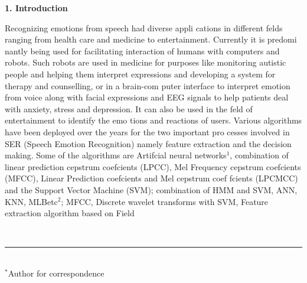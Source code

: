 \documentclass[10pt,a4paper,twoside]{article}
\begin{document}
\begin{multicols}{2}
{\Large  \color{tieude} \rmfamily \textbf{1. Introduction}}

{\vspace*{-1pt}
\hspace*{-10pt} Recognizing emotions from speech had diverse appli
cations in different felds ranging from health care and
medicine to entertainment. Currently it is predomi
nantly being used for facilitating interaction of humans
with computers and robots. Such robots are used in
medicine for purposes like monitoring autistic people
and helping them interpret expressions and developing
a system for therapy and counselling, or in a brain-com
puter interface to interpret emotion from voice along
with facial expressions and EEG signals to help patients
deal with anxiety, stress and depression. It can also be
used in the feld of entertainment to identify the emo
tions and reactions of users. Various algorithms have
been deployed over the years for the two important pro
cesses involved in SER (Speech Emotion Recognition)
namely feature extraction and the decision making.
Some of the algorithms are Artifcial neural networks$^1$,
combination of linear prediction cepstrum coefcients
(LPCC), Mel Frequency cepstrum coefcients (MFCC),
Linear Prediction coefcients and Mel cepstrum coef
fcients (LPCMCC) and the Support Vector Machine
(SVM); combination of HMM and SVM, ANN, KNN,
MLBetc$^2$; MFCC, Discrete wavelet transforms with
SVM, Feature extraction algorithm based on Field}
\end{multicols}
{\color{tieude}\ \rule{3cm}{0.1pt}}\\
$^*$Author for correspondence
\end{document}
